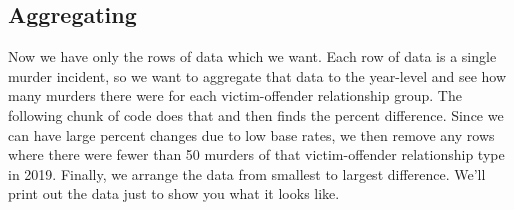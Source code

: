 \documentclass[
]{krantz}
\begin{document}
\hypertarget{aggregating}{%
\subsection{Aggregating}\label{aggregating}}

Now we have only the rows of data which we want. Each row of
data is a single murder incident, so we want to aggregate
that data to the year-level and see how many murders there
were for each victim-offender relationship group. The
following chunk of code does that and then finds the percent
difference. Since we can have large percent changes due to
low base rates, we then remove any rows where there were
fewer than 50 murders of that victim-offender relationship
type in 2019. Finally, we arrange the data from smallest to
largest difference. We'll print out the data just to show
you what it looks like.
\end{document}
